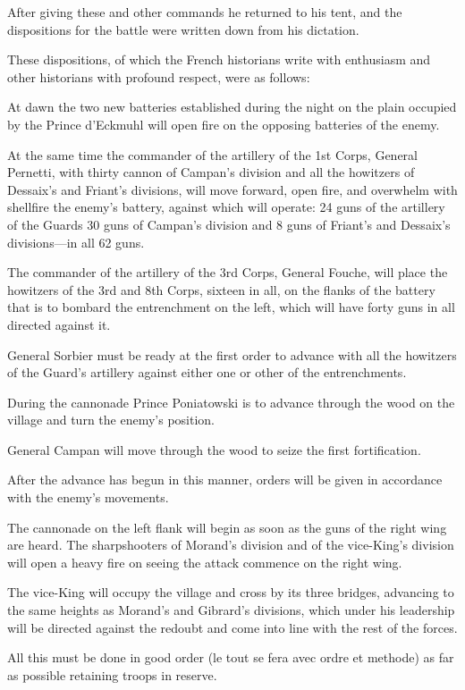 After giving these and other commands he returned to his tent,
and the dispositions for the battle were written down from his
dictation.

These dispositions, of which the French historians write with
enthusiasm and other historians with profound respect, were as
follows:

At dawn the two new batteries established during the night on the
plain occupied by the Prince d'Eckmuhl will open fire on the
opposing batteries of the enemy.

At the same time the commander of the artillery of the 1st Corps,
General Pernetti, with thirty cannon of Campan's division and all
the howitzers of Dessaix's and Friant's divisions, will move
forward, open fire, and overwhelm with shellfire the enemy's
battery, against which will operate: 24 guns of the artillery of
the Guards 30 guns of Campan's division and 8 guns of Friant's
and Dessaix's divisions---in all 62 guns.

The commander of the artillery of the 3rd Corps, General Fouche,
will place the howitzers of the 3rd and 8th Corps, sixteen in
all, on the flanks of the battery that is to bombard the
entrenchment on the left, which will have forty guns in all
directed against it.

General Sorbier must be ready at the first order to advance with
all the howitzers of the Guard's artillery against either one or
other of the entrenchments.

During the cannonade Prince Poniatowski is to advance through the
wood on the village and turn the enemy's position.

General Campan will move through the wood to seize the first
fortification.

After the advance has begun in this manner, orders will be given
in accordance with the enemy's movements.

The cannonade on the left flank will begin as soon as the guns of
the right wing are heard. The sharpshooters of Morand's division
and of the vice-King's division will open a heavy fire on seeing
the attack commence on the right wing.

The vice-King will occupy the village and cross by its three
bridges, advancing to the same heights as Morand's and Gibrard's
divisions, which under his leadership will be directed against
the redoubt and come into line with the rest of the forces.

All this must be done in good order (le tout se fera avec ordre
et methode) as far as possible retaining troops in reserve.

